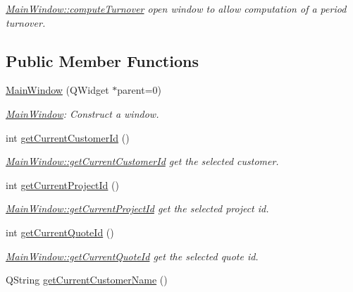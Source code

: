 \begin{DoxyCompactItemize}
\begin{DoxyCompactList}\small\item\em \hyperlink{classGui_1_1MainWindow_aa4cfc2b980835fe1ccd5b869a237c05f}{Main\+Window\+::compute\+Turnover} open window to allow computation of a period turnover. \end{DoxyCompactList}\end{DoxyCompactItemize}
\subsection*{Public Member Functions}
\begin{DoxyCompactItemize}
\item 
\hyperlink{classGui_1_1MainWindow_a5ea8e526d288b96595618942d44154d3}{Main\+Window} (Q\+Widget $\ast$parent=0)
\begin{DoxyCompactList}\small\item\em \hyperlink{classGui_1_1MainWindow}{Main\+Window}\+: Construct a window. \end{DoxyCompactList}\item 
int \hyperlink{classGui_1_1MainWindow_a202cb1e7a7c0e47af15306c2587693ec}{get\+Current\+Customer\+Id} ()
\begin{DoxyCompactList}\small\item\em \hyperlink{classGui_1_1MainWindow_a202cb1e7a7c0e47af15306c2587693ec}{Main\+Window\+::get\+Current\+Customer\+Id} get the selected customer. \end{DoxyCompactList}\item 
int \hyperlink{classGui_1_1MainWindow_a9580e96fd90710c5e2c299c68108409a}{get\+Current\+Project\+Id} ()
\begin{DoxyCompactList}\small\item\em \hyperlink{classGui_1_1MainWindow_a9580e96fd90710c5e2c299c68108409a}{Main\+Window\+::get\+Current\+Project\+Id} get the selected project id. \end{DoxyCompactList}\item 
int \hyperlink{classGui_1_1MainWindow_aaf5e1b2cb797894207f4c5e86d2d4dcf}{get\+Current\+Quote\+Id} ()
\begin{DoxyCompactList}\small\item\em \hyperlink{classGui_1_1MainWindow_aaf5e1b2cb797894207f4c5e86d2d4dcf}{Main\+Window\+::get\+Current\+Quote\+Id} get the selected quote id. \end{DoxyCompactList}\item 
Q\+String \hyperlink{classGui_1_1MainWindow_a0303a1752424b1e8c1a6e1b0bba2a823}{get\+Current\+Customer\+Name} ()

\end{DoxyCompactItemize}
